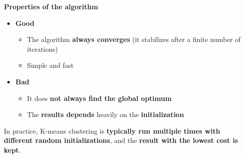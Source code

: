 \highspace
\begin{flushleft}
    \textcolor{Green3}{ \textbf{Properties of the algorithm}}
\end{flushleft}
\begin{itemize}
    \item[\textcolor{Green3}{\faIcon{check}}] \textcolor{Green3}{\textbf{Good}}
    \begin{itemize}
        \item The algorithm \textbf{always converges} (it stabilizes after a finite number of iterations)
        \item Simple and fast
    \end{itemize}

    \item[\textcolor{Red2}{\faIcon{times}}] \textcolor{Red2}{\textbf{Bad}}
    \begin{itemize}
        \item It does \textbf{not always find the global optimum}
        \item The \textbf{results depends} heavily on the \textbf{initialization}
    \end{itemize}
\end{itemize}
In practice, K-means clustering is \textbf{typically run multiple times with different random initializations}, and the \textbf{result with the lowest cost is kept}.